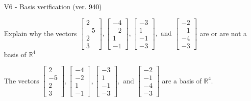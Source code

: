 \begin{exercise}
  \begin{exerciseTitle}V6 - Basis verification (ver. 940)\end{exerciseTitle}
  \begin{exerciseStatement}
    Explain why the vectors \(\left[\begin{array}{r}
2 \\
-5 \\
2 \\
3
\end{array}\right] , \left[\begin{array}{r}
-4 \\
-2 \\
1 \\
-1
\end{array}\right] , \left[\begin{array}{r}
-3 \\
1 \\
-1 \\
-3
\end{array}\right] , \text{ and } \left[\begin{array}{r}
-2 \\
-1 \\
-4 \\
-3
\end{array}\right]\) are or are not a basis of \(\mathbb{R}^4\)	


  \end{exerciseStatement}
  \begin{exerciseAnswer}
   The vectors \(\left[\begin{array}{r}
2 \\
-5 \\
2 \\
3
\end{array}\right] , \left[\begin{array}{r}
-4 \\
-2 \\
1 \\
-1
\end{array}\right] , \left[\begin{array}{r}
-3 \\
1 \\
-1 \\
-3
\end{array}\right] , \text{ and } \left[\begin{array}{r}
-2 \\
-1 \\
-4 \\
-3
\end{array}\right]\) 
  	 are  a basis of \(\mathbb{R}^4\).
  


  \end{exerciseAnswer}
\end{exercise}